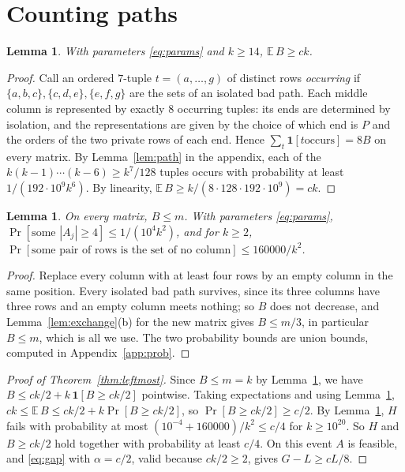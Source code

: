 \documentclass[11pt]{article}
\newtheorem{lemma}[theorem]{Lemma}
\theoremstyle{remark}
\begin{document}
\section{Counting paths}

\begin{lemma}\label{lem:count}
With parameters \eqref{eq:params} and $k\ge14$, $\mathbb E\,B\ge ck$.
\end{lemma}

\begin{proof}
Call an ordered $7$-tuple $t=(a,\dots,g)$ of distinct rows
\emph{occurring} if $\{a,b,c\},\{c,d,e\},\{e,f,g\}$ are the sets of an
isolated bad path. Each middle column is represented by exactly $8$
occurring tuples: its ends are determined by isolation, and the
representations are given by the choice of which end is $P$ and the orders
of the two private rows of each end. Hence $\sum_t\mathbf 1[t\text{
occurs}]=8B$ on every matrix. By Lemma~\ref{lem:path} in the appendix,
each of the $k(k-1)\cdots(k-6)\ge k^7/128$ tuples occurs with probability
at least $1/(192\cdot10^9k^6)$. By linearity, $\mathbb E\,B\ge
k/(8\cdot128\cdot192\cdot10^9)=ck$.
\end{proof}

\begin{lemma}\label{lem:tails}
On every matrix, $B\le m$. With parameters \eqref{eq:params},
$\Pr[\text{some }|A_j|\ge4]\le1/(10^4k^2)$, and for $k\ge2$,
$\Pr[\text{some pair of rows is the set of no column}]\le160000/k^2$.
\end{lemma}

\begin{proof}
Replace every column with at least four rows by an empty column in the
same position. Every isolated bad path survives, since its three columns
have three rows and an empty column meets nothing; so $B$ does not
decrease, and Lemma~\ref{lem:exchange}(b) for the new matrix gives $B\le
m/3$, in particular $B\le m$, which is all we use. The two probability bounds are union bounds, computed in
Appendix~\ref{app:prob}.
\end{proof}

\begin{proof}[Proof of Theorem~\ref{thm:leftmost}]
Since $B\le m=k$ by Lemma~\ref{lem:tails}, we have
$B\le ck/2+k\,\mathbf 1[B\ge ck/2]$ pointwise. Taking expectations and
using Lemma~\ref{lem:count}, $ck\le\mathbb E\,B\le ck/2+k\Pr[B\ge ck/2]$,
so $\Pr[B\ge ck/2]\ge c/2$. By
Lemma~\ref{lem:tails}, $H$ fails with probability at most
$(10^{-4}+160000)/k^2\le c/4$ for $k\ge10^{20}$. So $H$ and $B\ge ck/2$
hold together with probability at least $c/4$. On this event $A$ is
feasible, and \eqref{eq:gap} with $\alpha=c/2$, valid because $ck/2\ge2$,
gives $G-L\ge cL/8$.
\end{proof}
\end{document}
